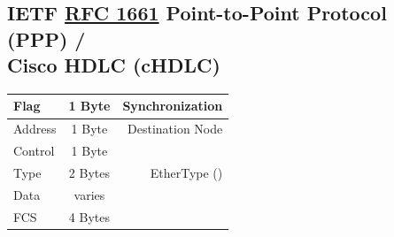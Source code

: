 \documentclass[12pt]{article}
\newcommand{\RFC}[1]{\href{https://datatracker.ietf.org/doc/html/rfc#1}{RFC #1}}
\begin{document}
	\subsection[IETF RFC 1661 PPP / Cisco HDLC (cHDLC)]{IETF \RFC{1661} Point-to-Point Protocol (PPP) /\\Cisco HDLC (cHDLC) \label{subsec:IETF PPP}}
	\begin{table}[H]
	\centering
	\begin{tabular}{| l | c | r |}\hline
	Flag		& 1 Byte	& Synchronization\\\hline
	Address	& 1 Byte	& Destination Node\\\hline
	Control	& 1 Byte	&\\\hline
	Type		& 2 Bytes	& EtherType (\Cref{tab:ETHERTYPE})\\\hline
	Data		& varies	&\\\hline
	FCS		& 4 Bytes	&\\\hline
	\end{tabular}\end{table}





\end{document}
